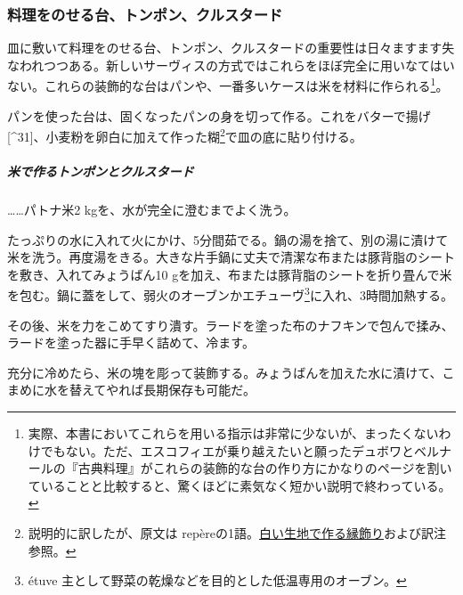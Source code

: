 \begin{recette}
{\subsubsection{料理をのせる台、トンポン、クルスタード}\label{fonds-de-plats}}


 
 

皿に敷いて料理をのせる台、トンポン、クルスタードの重要性は日々ますます失なわれつつある。新しいサーヴィスの方式ではこれらをほぼ完全に用いなてはいない。これらの装飾的な台はパンや、一番多いケースは米を材料に作られる\footnote{実際、本書においてこれらを用いる指示は非常に少ないが、まったくないわけでもない。ただ、エスコフィエが乗り越えたいと願ったデュボワとベルナールの『古典料理』がこれらの装飾的な台の作り方にかなりのページを割いていることと比較すると、驚くほどに素気なく短かい説明で終わっている。}。

パンを使った台は、固くなったパンの身を切って作る。これをバターで揚げ
{[}\^{}31{]}、小麦粉を卵白に加えて作った糊\footnote{説明的に訳したが、原文は
  repèreの1語。\protect\hyperlink{bordures-en-pate-blanche}{白い生地で作る縁飾り}および訳注参照。}で皿の底に貼り付ける。

\hypertarget{ux7c73ux3067ux4f5cux308bux30c8ux30f3ux30ddux30f3ux3068ux30afux30ebux30b9ux30bfux30fcux30c9}{%
\subparagraph{米で作るトンポンとクルスタード}\label{ux7c73ux3067ux4f5cux308bux30c8ux30f3ux30ddux30f3ux3068ux30afux30ebux30b9ux30bfux30fcux30c9}}

\ldots{}\ldots{}パトナ米2 kgを、水が完全に澄むまでよく洗う。

たっぷりの水に入れて火にかけ、5分間茹でる。鍋の湯を捨て、別の湯に漬けて米を洗う。再度湯をきる。大きな片手鍋に丈夫で清潔な布または豚背脂のシートを敷き、入れてみょうばん10
\nolinebreak[4]gを加え、布または豚背脂のシートを折り畳んで米を包む。鍋に蓋をして、弱火のオーブンかエチューヴ\footnote{étuve
  主として野菜の乾燥などを目的とした低温専用のオーブン。}に入れ、3時間加熱する。

その後、米を力をこめてすり潰す。ラードを塗った布のナフキンで包んで揉み、ラードを塗った器に手早く詰めて、冷ます。

充分に冷めたら、米の塊を彫って装飾する。みょうばんを加えた水に漬けて、こまめに水を替えてやれば長期保存も可能だ。

\atoaki{}


\end{recette}
